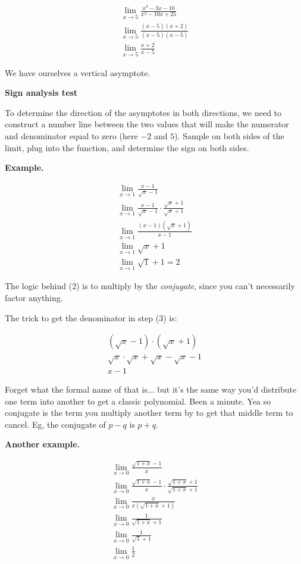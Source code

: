 \documentclass{article}
\begin{document}
\begin{align*}
    \lim_{x \to 5} \frac{x^3 - 3x - 10}{x^2 - 10x + 25}\\
    \lim_{x \to 5} \frac{(x-5)(x+2)}{(x-5)(x-5)}\\
    \lim_{x \to 5} \frac{x+2}{x-5}
\end{align*}

We have ourselves a vertical asymptote.

\textbf{Sign analysis test}

To determine the direction of the asymptotes in both directions, we need to construct a
number line between the two values that will make the numerator and denominator equal to
zero (here $-2$ and $5$). Sample on both sides of the limit, plug into the function, and
determine the sign on both sides.


\textbf{Example.}

\begin{align}
    \lim_{x \to 1} \frac{x-1}{\sqrt{x} - 1}\\
    \lim_{x \to 1} \frac{x-1}{\sqrt{x} - 1} \cdot \frac{\sqrt{x} + 1}{\sqrt{x} + 1}\\
    \lim_{x \to 1} \frac{(x - 1)(\sqrt{x} + 1)}{x - 1}\\
    \lim_{x \to 1} \sqrt{x} + 1\\
    \lim_{x \to 1} \sqrt{1} + 1 = 2
\end{align}

The logic behind (2) is to multiply by the \emph{conjugate}, since you can't necessarily
factor anything. 

The trick to get the denominator in step (3) is:

\begin{align*}
    (\sqrt{x} - 1) \cdot (\sqrt{x} + 1)\\
    \sqrt{x} \cdot \sqrt{x} + \sqrt{x} - \sqrt{x} - 1\\
    x - 1
\end{align*}

Forget what the formal name of that is... but it's the same way you'd distribute one term
into another to get a classic polynomial. Been a minute. Yea so conjugate is the term you
multiply another term by to get that middle term to cancel. Eg, the conjugate of $p-q$ is
$p+q$.

\textbf{Another example.}

\begin{align*}
    \lim_{x \to 0} \frac{\sqrt{1 + x} - 1}{x}\\
    \lim_{x\to 0} \frac{\sqrt{1+x} - 1}{x} \cdot \frac{\sqrt{1+x} + 1}{\sqrt{1+x} + 1}\\
    \lim_{x\to 0} \frac{x}{x(\sqrt{1+x} + 1)}\\
    \lim_{x \to 0} \frac{1}{\sqrt{1 + x} + 1}\\
    \lim_{x\to 0} \frac{1}{\sqrt{1} + 1}\\
    \lim_{x\to 0} \frac{1}{2}
\end{align*}
\end{document}
